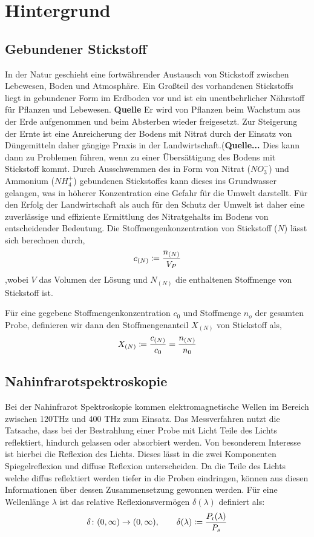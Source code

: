 \section{Hintergrund}
\label{sec:Hintergrund}
	
	\subsection{Gebundener Stickstoff}
	\label{ssec:Gebundener Stickstoff}
	
	In der Natur geschieht eine fortwährender Austausch von Stickstoff zwischen Lebewesen, Boden und Atmosphäre. 
	Ein Großteil des vorhandenen Stickstoffs liegt in gebundener Form im Erdboden vor und ist ein unentbehrlicher Nährstoff für Pflanzen und Lebewesen. \textbf{Quelle}
	Er wird von Pflanzen beim Wachstum aus der Erde aufgenommen und beim Absterben wieder freigesetzt.
    Zur Steigerung der Ernte ist eine Anreicherung der Bodens mit Nitrat durch der Einsatz von Düngemitteln daher gängige Praxis in der Landwirtschaft.(\textbf{Quelle...}
    Dies kann dann zu Problemen führen, wenn zu einer Übersättigung des Bodens mit Stickstoff kommt.
    Durch Ausschwemmen des in Form von Nitrat ($NO_3^-$) und Ammonium ($NH_4^+$) gebundenen Stickstoffes kann dieses ins Grundwasser gelangen, was in höherer Konzentration eine Gefahr für die Umwelt darstellt.
    Für den Erfolg der Landwirtschaft als auch für den Schutz der Umwelt ist daher eine zuverlässige und effiziente Ermittlung des Nitratgehalts im Bodens von entscheidender Bedeutung.
    Die Stoffmengenkonzentration von Stickstoff ($N$) lässt sich berechnen durch,
    	\[
			c_{(N)} \coloneqq \frac{n_{(N)}}{V_P}
		\]
		,wobei $V$ das Volumen der Lösung und $N_{(N)}$ die enthaltenen Stoffmenge von Stickstoff ist.
		
    Für eine gegebene Stoffmengenkonzentration $c_0$ und Stoffmenge $n_o$ der gesamten Probe, definieren wir dann den Stoffmengenanteil $X_{(N)}$ von Stickstoff als,
        \[
			X_{(N)} \coloneqq \frac{c_{(N)}}{c_0} = \frac{n_{(N)}}{n_0}
		\]
   

	\subsection{Nahinfrarotspektroskopie}
	\label{ssec:nirs}
	
		Bei der Nahinfrarot Spektroskopie kommen elektromagnetische Wellen im Bereich zwischen 120THz und 400 THz zum Einsatz. \cite{Agelet2010}
		Das Messverfahren nutzt die Tatsache, dass bei der Bestrahlung einer Probe mit Licht Teile des Lichts reflektiert, hindurch gelassen oder absorbiert werden.
		Von besonderem Interesse ist hierbei die Reflexion des Lichts.
		Dieses lässt in die zwei Komponenten Spiegelreflexion und diffuse Reflexion unterscheiden.
		Da die Teile des Lichts welche diffus reflektiert werden tiefer in die Proben eindringen, können aus diesen Informationen über dessen Zusammensetzung gewonnen werden. 
		Für eine Wellenlänge $\lambda$ ist das relative Reflexionsvermögen $\delta(\lambda)$ definiert als:
		\[
			\delta\colon(0,\infty)\to(0,\infty),\qquad \delta(\lambda) \coloneqq \frac{P_{\mathrm{r}}(\lambda)}{P_s}
		\]
		
